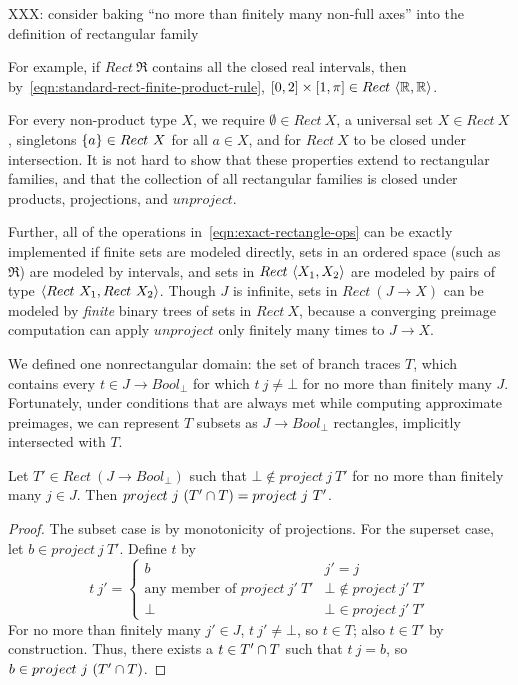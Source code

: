 \documentclass[preprint]{sigplanconf}
\begin{document}
XXX: consider baking ``no more than finitely many non-full axes'' into the definition of rectangular family

For example, if $Rect~\Re$ contains all the closed real intervals, then by~\eqref{eqn:standard-rect-finite-product-rule}, $[0,2] \times [1,\pi] \in Rect~\langle{\mathbb{R},\mathbb{R}}\rangle$.

For every non-product type $X$, we require $\emptyset \in Rect~X$, a universal set $X \in Rect~X$, singletons $\{{a}\} \in Rect~X$ for all $a \in X$, and for $Rect~X$ to be closed under intersection.
It is not hard to show that these properties extend to rectangular families, and that the collection of all rectangular families is closed under products, projections, and $unproject$.

Further, all of the operations in~\eqref{eqn:exact-rectangle-ops} can be exactly implemented if finite sets are modeled directly, sets in an ordered space (such as $\Re$) are modeled by intervals, and sets in $Rect~\langle{X_1,X_2}\rangle$ are modeled by pairs of type $\langle{Rect~X_1,Rect~X_2}\rangle$.
Though $J$ is infinite, sets in $Rect~(J \to X)$ can be modeled by \emph{finite} binary trees of sets in $Rect~X$, because a converging preimage computation can apply $unproject$ only finitely many times to $J \to X$.

We defined one nonrectangular domain: the set of branch traces $T$, which contains every $t \in J \to Bool_\bot$ for which $t~j \neq \bot$ for no more than finitely many $J$.
Fortunately, under conditions that are always met while computing approximate preimages, we can represent $T$ subsets as $J \to Bool_\bot$ rectangles, implicitly intersected with $T$.

\begin{theorem}
Let $T' \in Rect~(J \to Bool_\bot)$ such that $\bot \notin project~j~T'$ for no more than finitely many $j \in J$.
Then $project~j~(T' \cap T) = project~j~T'$.
\end{theorem}
\begin{proof}
The subset case is by monotonicity of projections.
For the superset case, let $b \in project~j~T'$.
Define $t$ by
\begin{equation}
	t~j' =
	\begin{cases}
		b & j' = j \\
		\text{any member of } project~j'~T' & \bot \notin project~j'~T' \\
		\bot & \bot \in project~j'~T'
	\end{cases}
\end{equation}
For no more than finitely many $j' \in J$, $t~j' \neq \bot$, so $t \in T$; also $t \in T'$ by construction.
Thus, there exists a $t \in T' \cap T$ such that $t~j = b$, so $b \in project~j~(T' \cap T)$.
\end{proof}
\end{document}

